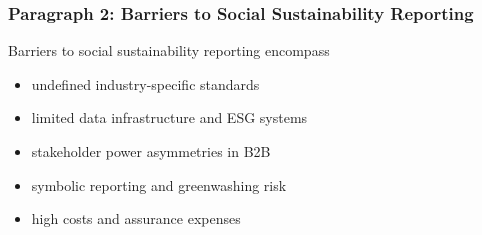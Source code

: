 \subsubsection{Paragraph 2: Barriers to Social Sustainability Reporting}
Barriers to social sustainability reporting encompass 
\begin{itemize}
    \item undefined industry-specific standards \parencite{Bochkay2025}
    \item limited data infrastructure and ESG systems \parencite{Troshani2024,ElBaz2022,Jona2023,Belal2015}
    \item stakeholder power asymmetries in B2B \parencite{Dai2021}
    \item symbolic reporting and greenwashing risk \parencite{Reitmaier2024,Belal2015}
    \item high costs and assurance expenses \parencite{Dai2021,Najjar2023}
\end{itemize}